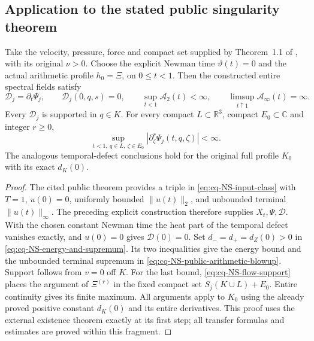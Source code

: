 \subsection{Application to the stated public singularity theorem}

\begin{cqtheorem}
\label{thm:cq-NS-public-propagation}
Take the velocity, pressure, force and compact set supplied
by Theorem~1.1 of \cite{cqNS2026}, with its original $\nu>0$.
Choose the explicit Newman time $\vartheta(t)=0$ and the
actual arithmetic profile $h_0=\Xi$, on $0\leq t<1$.
Then the constructed entire spectral fields satisfy
\begin{equation}
 \mathscr D_j=\partial_t\Psi_j,\qquad
 \mathscr D_j(0,q,s)=0,\qquad
 \sup_{t<1}\mathcal A_2(t)<\infty,\qquad
 \limsup_{t\uparrow1}\mathcal A_\infty(t)=\infty .
 \label{eq:cq-NS-public-arithmetic-blowup}
\end{equation}
Every $\mathscr D_j$ is supported in $q\in K$.
For every compact $L\subset\mathbb R^3$, compact
$E_0\subset\mathbb C$ and integer $r\geq0$,
\begin{equation}
 \sup_{t<1,\ q\in L,\ \zeta\in E_0}
             |\partial_\zeta^r\Psi_j(t,q,\zeta)|<\infty .
 \label{eq:cq-NS-bounded-spectral-profiles}
\end{equation}
The analogous temporal-defect conclusions hold for the
original full profile $K_0$ with its exact $d_K(0)$.
\end{cqtheorem}

\begin{proof}
The cited public theorem provides a triple in
\eqref{eq:cq-NS-input-class} with $T=1$, $u(0)=0$,
uniformly bounded $\|u(t)\|_2$, and unbounded terminal
$\|u(t)\|_\infty$. The preceding explicit construction
therefore supplies $X_t,\Psi,\mathscr D$. With the chosen
constant Newman time the heat part of the temporal defect
vanishes exactly, and $u(0)=0$ gives $\mathscr D(0)=0$.
Set $d_-=d_+=d_Z(0)>0$ in
\eqref{eq:cq-NS-energy-and-supremum}. Its two inequalities
give the energy bound and the unbounded terminal supremum
in \eqref{eq:cq-NS-public-arithmetic-blowup}.
Support follows from $v=0$ off $K$.
For the last bound,
\eqref{eq:cq-NS-flow-support} places the argument of
$\Xi^{(r)}$ in the fixed compact set $S_j(K\cup L)+E_0$.
Entire continuity gives its finite maximum.
All arguments apply to $K_0$ using the already proved
positive constant $d_K(0)$ and its entire derivatives.
This proof uses the external existence theorem exactly at
its first step; all transfer formulas and estimates are
proved within this fragment.
\end{proof}

